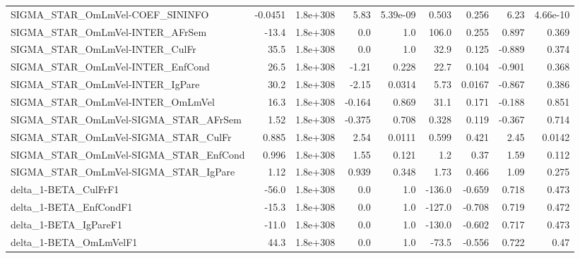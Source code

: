 \begin{tabular}{lrrrrrrrr}
SIGMA\_STAR\_OmLmVel-COEF\_SININFO       &     -0.0451 &     1.8e+308 &    5.83 & 5.39e-09 &      0.503 &       0.256 &         6.23 &      4.66e-10 \\
SIGMA\_STAR\_OmLmVel-INTER\_AFrSem       &       -13.4 &     1.8e+308 &     0.0 &      1.0 &      106.0 &       0.255 &        0.897 &         0.369 \\
SIGMA\_STAR\_OmLmVel-INTER\_CulFr        &        35.5 &     1.8e+308 &     0.0 &      1.0 &       32.9 &       0.125 &       -0.889 &         0.374 \\
SIGMA\_STAR\_OmLmVel-INTER\_EnfCond      &        26.5 &     1.8e+308 &   -1.21 &    0.228 &       22.7 &       0.104 &       -0.901 &         0.368 \\
SIGMA\_STAR\_OmLmVel-INTER\_IgPare       &        30.2 &     1.8e+308 &   -2.15 &   0.0314 &       5.73 &      0.0167 &       -0.867 &         0.386 \\
SIGMA\_STAR\_OmLmVel-INTER\_OmLmVel      &        16.3 &     1.8e+308 &  -0.164 &    0.869 &       31.1 &       0.171 &       -0.188 &         0.851 \\
SIGMA\_STAR\_OmLmVel-SIGMA\_STAR\_AFrSem  &        1.52 &     1.8e+308 &  -0.375 &    0.708 &      0.328 &       0.119 &       -0.367 &         0.714 \\
SIGMA\_STAR\_OmLmVel-SIGMA\_STAR\_CulFr   &       0.885 &     1.8e+308 &    2.54 &   0.0111 &      0.599 &       0.421 &         2.45 &        0.0142 \\
SIGMA\_STAR\_OmLmVel-SIGMA\_STAR\_EnfCond &       0.996 &     1.8e+308 &    1.55 &    0.121 &        1.2 &        0.37 &         1.59 &         0.112 \\
SIGMA\_STAR\_OmLmVel-SIGMA\_STAR\_IgPare  &        1.12 &     1.8e+308 &   0.939 &    0.348 &       1.73 &       0.466 &         1.09 &         0.275 \\
delta\_1-BETA\_CulFrF1                  &       -56.0 &     1.8e+308 &     0.0 &      1.0 &     -136.0 &      -0.659 &        0.718 &         0.473 \\
delta\_1-BETA\_EnfCondF1                &       -15.3 &     1.8e+308 &     0.0 &      1.0 &     -127.0 &      -0.708 &        0.719 &         0.472 \\
delta\_1-BETA\_IgPareF1                 &       -11.0 &     1.8e+308 &     0.0 &      1.0 &     -130.0 &      -0.602 &        0.717 &         0.473 \\
delta\_1-BETA\_OmLmVelF1                &        44.3 &     1.8e+308 &     0.0 &      1.0 &      -73.5 &      -0.556 &        0.722 &          0.47 \\

\end{tabular}
